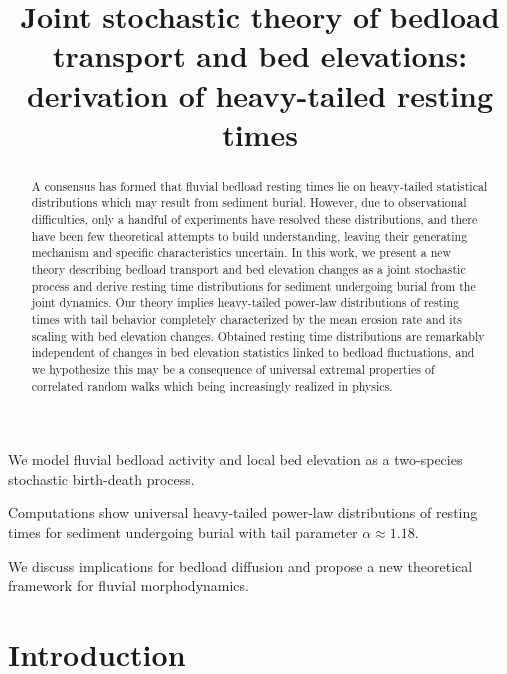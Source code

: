 \documentclass[draft]{agujournal2018}
\begin{document}
\title{Joint stochastic theory of bedload transport and bed elevations: derivation of heavy-tailed resting times}

\begin{keypoints}
\item We model fluvial bedload activity and local bed elevation as a two-species stochastic birth-death process.
\item Computations show universal heavy-tailed power-law distributions of resting times for sediment undergoing burial with tail parameter $\alpha\approx 1.18$.
\item We discuss implications for bedload diffusion and propose a new theoretical framework for fluvial morphodynamics.

\end{keypoints}

\begin{abstract}
A consensus has formed that fluvial bedload resting times lie on heavy-tailed statistical distributions which may result from sediment burial.
However, due to observational difficulties, only a handful of experiments have resolved these distributions, and there have been few theoretical attempts to build understanding, leaving their generating mechanism and specific characteristics uncertain.
In this work, we present a new theory describing bedload transport and bed elevation changes as a joint stochastic process and derive resting time distributions for sediment undergoing burial from the joint dynamics.
Our theory implies heavy-tailed power-law distributions of resting times with tail behavior completely characterized by the mean erosion rate and its scaling with bed elevation changes.
Obtained resting time distributions are remarkably independent of changes in bed elevation statistics linked to bedload fluctuations, and we hypothesize this may be a consequence of universal extremal properties of correlated random walks which being increasingly realized in physics.


\end{abstract} 

\section{Introduction}
\end{document}
